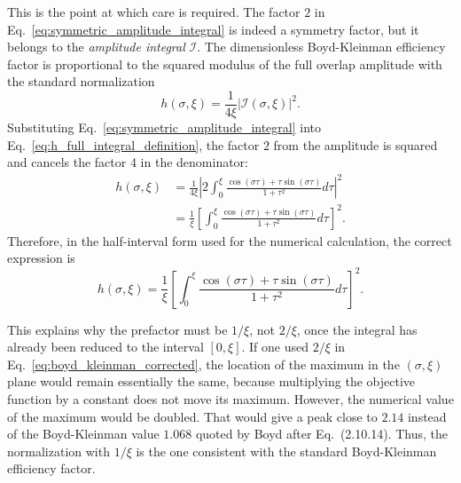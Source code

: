 \begin{resolucao}[Solution]
        This is the point at which care is required. The factor $2$ in Eq.~\eqref{eq:symmetric_amplitude_integral} is indeed a symmetry factor, but it belongs to the \emph{amplitude integral} $\mathcal I$. The dimensionless Boyd-Kleinman efficiency factor is proportional to the squared modulus of the full overlap amplitude with the standard normalization
        \begin{equation}
            h(\sigma,\xi)
            =
            \frac{1}{4\xi}
            \left|
            \mathcal I(\sigma,\xi)
            \right|^2.
            \label{eq:h_full_integral_definition}
        \end{equation}
        Substituting Eq.~\eqref{eq:symmetric_amplitude_integral} into Eq.~\eqref{eq:h_full_integral_definition}, the factor $2$ from the amplitude is squared and cancels the factor $4$ in the denominator:
        \begin{align}
            h(\sigma,\xi)
            &=
            \frac{1}{4\xi}
            \left|
            2
            \int_0^\xi
            \frac{
            \cos(\sigma\tau)+\tau\sin(\sigma\tau)
            }{
            1+\tau^2
            }
            d\tau
            \right|^2
            \nonumber\\
            &=
            \frac{1}{\xi}
            \left[
            \int_0^\xi
            \frac{
            \cos(\sigma\tau)+\tau\sin(\sigma\tau)
            }{
            1+\tau^2
            }
            d\tau
            \right]^2.
            \label{eq:boyd_kleinman}
        \end{align}
        Therefore, in the half-interval form used for the numerical calculation, the correct expression is
        \begin{equation}
            \boxed{
            h(\sigma, \xi)
            =
            \frac{1}{\xi}
            \left[
            \int_{0}^{\xi}
            \frac{
            \cos(\sigma \tau)+\tau \sin(\sigma \tau)
            }{
            1+\tau^2
            }
            d\tau
            \right]^2
            }.
            \label{eq:boyd_kleinman_corrected}
        \end{equation}

        This explains why the prefactor must be $1/\xi$, not $2/\xi$, once the integral has already been reduced to the interval $[0,\xi]$. If one used $2/\xi$ in Eq.~\eqref{eq:boyd_kleinman_corrected}, the location of the maximum in the $(\sigma,\xi)$ plane would remain essentially the same, because multiplying the objective function by a constant does not move its maximum. However, the numerical value of the maximum would be doubled. That would give a peak close to $2.14$ instead of the Boyd-Kleinman value $1.068$ quoted by Boyd after Eq.~(2.10.14). Thus, the normalization with $1/\xi$ is the one consistent with the standard Boyd-Kleinman efficiency factor.


\end{resolucao}
